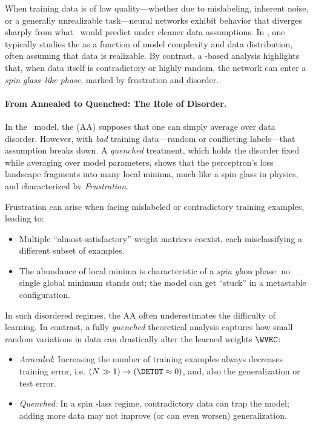 \label{sxn:SMOG_main-spin_glass}

When training data is of low quality---whether due to mislabeling, inherent noise, or a generally unrealizable task---neural networks exhibit behavior that diverges sharply from what \SLT\ would predict under cleaner data assumptions. In \SLT, one typically studies the \GeneralizationError as a function of model complexity and data distribution, often assuming that data is realizable. By contrast, a \STATMECH-based analysis highlights that, when data itself is contradictory or highly random, the network can enter a \emph{spin glass--like phase}, marked by frustration and disorder.

\paragraph{From Annealed to Quenched: The Role of Disorder.}
In the \StudentTeacher\ model, the \AnnealedApproximation (AA) supposes that one can simply average over data disorder. However, with \emph{bad} training data---random or conflicting labels---that assumption breaks down. A \emph{quenched} treatment, which holds the disorder fixed while averaging over model parameters, shows that the perceptron's loss landscape fragments into many local minima, much like a spin glass in physics, and characterized bv \emph{Frustration}.

Frustration can arise when facing mislabeled or contradictory training examples, leading to:
\begin{itemize}
\item Multiple ``almost-satisfactory'' weight matrices coexist, each misclassifying a different subset of examples.
\item The abundance of local minima is characteristic of a \emph{spin glass} phase: no single global minimum stands out; the model can get ``stuck'' in a metastable configuration.
\end{itemize}

In such disordered regimes, the AA often underestimates the difficulty of learning.
In contrast, a fully \emph{quenched} theoretical analysis captures
how small random variations in data can drastically alter the learned weights $\WVEC$:
\begin{itemize}
\item \emph{Annealed}: Increasing the number of training examples always decreases training error, i.e. $(N \gg 1) \rightarrow (\DETOT\approx 0)$, and, also the generalization or test error.  

\item \emph{Quenched}: In a spin -lass regime, contradictory data can trap the model; adding more data may not improve (or can even worsen) generalization.
\end{itemize}

